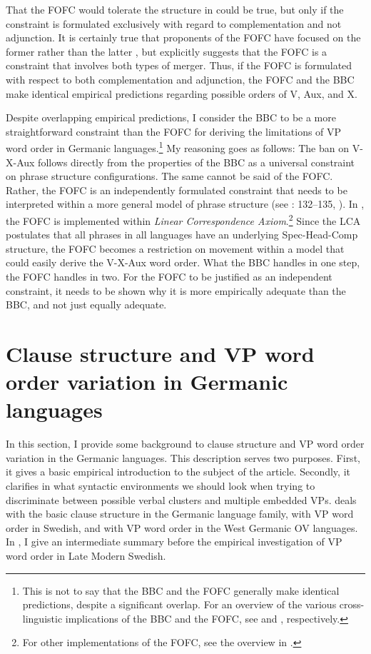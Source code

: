 \documentclass[output=paper, colorlinks, citecolor=brown]{langscibook}
\begin{document}
That the FOFC would tolerate the structure in  could be true, but only if the constraint is formulated exclusively with regard to complementation and not adjunction. It is certainly true that proponents of the FOFC have focused on the former rather than the latter \citep[97]{Sheehan2017Final}, but \citet{Sheehan2017Final} explicitly suggests that the FOFC is a constraint that involves both types of merger. Thus, if the FOFC is formulated with respect to both complementation and adjunction, the FOFC and the BBC make identical empirical predictions regarding possible orders of V, Aux, and X.

Despite overlapping empirical predictions, I consider the BBC to be a more straightforward constraint than the FOFC for deriving the limitations of VP word order in Germanic languages.\footnote{This is not to say that the BBC and the FOFC generally make identical predictions, despite a significant overlap. For an overview of the various cross-linguistic implications of the BBC and the FOFC, see \citet[10–17, 65–94]{Haider2013} and \citet[173–205]{BiberauerEtAl2014}, respectively.} My reasoning goes as follows: The ban on V-X-Aux follows directly from the properties of the BBC as a universal constraint on phrase structure configurations. The same cannot be said of the FOFC. Rather, the FOFC is an independently formulated constraint that needs to be interpreted within a more general model of phrase structure (see \citealt{Haider2013}: 132–135, \citealt[205–215]{BiberauerEtAl2014}). In \citet{BiberauerEtAl2014}, the FOFC is implemented within  \textit{Linear Correspondence Axiom}.\footnote{For other implementations of the FOFC, see the overview in \citet{Holmberg2017}.}  Since the LCA postulates that all phrases in all languages have an underlying Spec-Head-Comp structure, the FOFC becomes a restriction on movement within a model that could easily derive the V-X-Aux word order. What the BBC handles in one step, the FOFC handles in two. For the FOFC to be justified as an independent constraint, it needs to be shown why it is more empirically adequate than the BBC, and not just equally adequate.


\section{Clause structure and VP word order variation in Germanic languages}\label{sec:sangfelt:3}

In this section, I provide some background to clause structure and VP word order variation in the Germanic languages. This description serves two purposes. First, it gives a basic empirical introduction to the subject of the article. Secondly, it clarifies in what syntactic environments we should look when trying to discriminate between possible verbal clusters and multiple embedded VPs.  deals with the basic clause structure in the Germanic language family,  with VP word order in Swedish, and  with VP word order in the West Germanic OV languages. In , I give an intermediate summary before the empirical investigation of VP word order in Late Modern Swedish.
\end{document}
